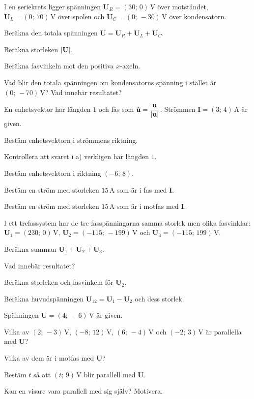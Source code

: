 I en seriekrets ligger spänningen $\mathbf{U}_R = (30;\, 0)\,\text{V}$ över motståndet,
$\mathbf{U}_L = (0;\, 70)\,\text{V}$ över spolen och $\mathbf{U}_C = (0;\, -30)\,\text{V}$ över
kondensatorn.
\begin{parts}
  \item Beräkna den totala spänningen $\mathbf{U} = \mathbf{U}_R + \mathbf{U}_L + \mathbf{U}_C$.
  \item Beräkna storleken $\lvert\mathbf{U}\rvert$.
  \item Beräkna fasvinkeln mot den positiva $x$-axeln.
  \item Vad blir den totala spänningen om kondensatorns spänning i stället är $(0;\, -70)\,\text{V}$?
    Vad innebär resultatet?
\end{parts}

En enhetsvektor har längden $1$ och fås som $\hat{\mathbf{u}} =
\dfrac{\mathbf{u}}{\lvert\mathbf{u}\rvert}$. Strömmen $\mathbf{I} = (3;\, 4)\,\text{A}$ är given.
\begin{parts}
  \item Bestäm enhetsvektorn i strömmens riktning.
  \item Kontrollera att svaret i a) verkligen har längden $1$.
  \item Bestäm enhetsvektorn i riktning $(-6;\, 8)$.
  \item Bestäm en ström med storleken $15\,\text{A}$ som är i fas med $\mathbf{I}$.
  \item Bestäm en ström med storleken $15\,\text{A}$ som är i motfas med $\mathbf{I}$.
\end{parts}

I ett trefassystem har de tre fasspänningarna samma storlek men olika fasvinklar: $\mathbf{U}_1 =
(230;\, 0)\,\text{V}$, $\mathbf{U}_2 = (-115;\, -199)\,\text{V}$ och $\mathbf{U}_3 = (-115;\,
199)\,\text{V}$.
\begin{parts}
  \item Beräkna summan $\mathbf{U}_1 + \mathbf{U}_2 + \mathbf{U}_3$.
  \item Vad innebär resultatet?
  \item Beräkna storleken och fasvinkeln för $\mathbf{U}_2$.
  \item Beräkna huvudspänningen $\mathbf{U}_{12} = \mathbf{U}_1 - \mathbf{U}_2$ och dess storlek.
\end{parts}

Spänningen $\mathbf{U} = (4;\, -6)\,\text{V}$ är given.
\begin{parts}
  \item Vilka av $(2;\, -3)\,\text{V}$, $(-8;\, 12)\,\text{V}$, $(6;\, -4)\,\text{V}$ och $(-2;\,
    3)\,\text{V}$ är parallella med $\mathbf{U}$?
  \item Vilka av dem är i motfas med $\mathbf{U}$?
  \item Bestäm $t$ så att $(t;\, 9)\,\text{V}$ blir parallell med $\mathbf{U}$.
  \item Kan en visare vara parallell med sig själv? Motivera.
\end{parts}

